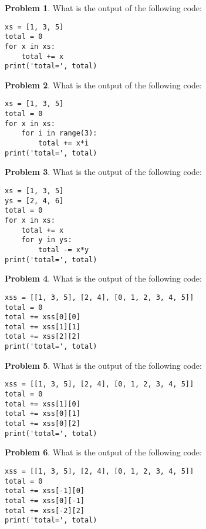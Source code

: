 \documentclass[10pt]{article}
\theoremstyle{definition}
\newtheorem{problem}{Problem}
\begin{document}
\begin{problem}
    What is the output of the following code:
\end{problem}
\begin{lstlisting}
xs = [1, 3, 5]
total = 0
for x in xs:
    total += x
print('total=', total)
\end{lstlisting}
\vspace{0.15in}

\newpage
\begin{problem}
    What is the output of the following code:
\end{problem}
\begin{lstlisting}
xs = [1, 3, 5]
total = 0
for x in xs:
    for i in range(3):
        total += x*i
print('total=', total)
\end{lstlisting}
\vspace{0.15in}


\begin{problem}
    What is the output of the following code:
\end{problem}
\begin{lstlisting}
xs = [1, 3, 5]
ys = [2, 4, 6]
total = 0
for x in xs:
    total += x
    for y in ys:
        total -= x*y
print('total=', total)
\end{lstlisting}
\vspace{0.15in}


\begin{problem}
    What is the output of the following code:
\end{problem}
\begin{lstlisting}
xss = [[1, 3, 5], [2, 4], [0, 1, 2, 3, 4, 5]]
total = 0
total += xss[0][0]
total += xss[1][1]
total += xss[2][2]
print('total=', total)
\end{lstlisting}
\vspace{0.15in}

\begin{problem}
    What is the output of the following code:
\end{problem}
\begin{lstlisting}
xss = [[1, 3, 5], [2, 4], [0, 1, 2, 3, 4, 5]]
total = 0
total += xss[1][0]
total += xss[0][1]
total += xss[0][2]
print('total=', total)
\end{lstlisting}
\vspace{0.15in}

\begin{problem}
    What is the output of the following code:
\end{problem}
\begin{lstlisting}
xss = [[1, 3, 5], [2, 4], [0, 1, 2, 3, 4, 5]]
total = 0
total += xss[-1][0]
total += xss[0][-1]
total += xss[-2][2]
print('total=', total)
\end{lstlisting}
\vspace{0.15in}
\end{document}
